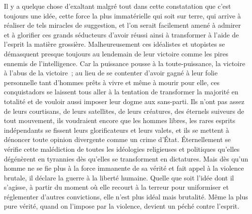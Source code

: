 \documentclass[french,twoside]{book} %
\begin{document}
Il y a quelque chose d’exaltant malgré tout dans cette constatation que c’est toujours une idée, cette force la plus immatérielle qui soit sur terre, qui arrive à réaliser de tels miracles de suggestion, et l’on serait facilement amené à admirer et à glorifier ces grands séducteurs d’avoir réussi ainsi à transformer à l’aide de l’esprit la matière grossière. Malheureusement ces idéalistes et utopistes se démasquent presque toujours au lendemain de leur victoire comme les pires ennemis de l’intelligence. Car la puissance pousse à la toute-puissance, la victoire à l’abus de la victoire ; au lieu de se contenter d’avoir gagné à leur folie personnelle tant d’hommes prêts à vivre et même à mourir pour elle, ces conquistadors se laissent tous aller à la tentation de transformer la majorité en totalité et de vouloir aussi imposer leur dogme aux sans-parti. Ils n’ont pas assez de leurs courtisans, de leurs satellites, de leurs créatures, des éternels suiveurs de tout mouvement, ils voudraient encore que les hommes libres, les rares esprits indépendants se fissent leurs glorificateurs et leurs valets, et ils se mettent à dénoncer toute opinion divergente comme un crime d’État. Éternellement se vérifie cette malédiction de toutes les idéologies religieuses et politiques qu’elles dégénèrent en tyrannies dès qu’elles se transforment en dictatures. Mais dès qu’un homme ne se fie plus à la force immanente de sa vérité et fait appel à la violence brutale, il déclare la guerre à la liberté humaine. Quelle que soit l’idée dont il s’agisse, à partir du moment où elle recourt à la terreur pour uniformiser et réglementer d’autres convictions, elle n’est plus idéal mais brutalité. Même la plus pure vérité, quand on l’impose par la violence, devient un péché contre l’esprit.\par
\end{document}
